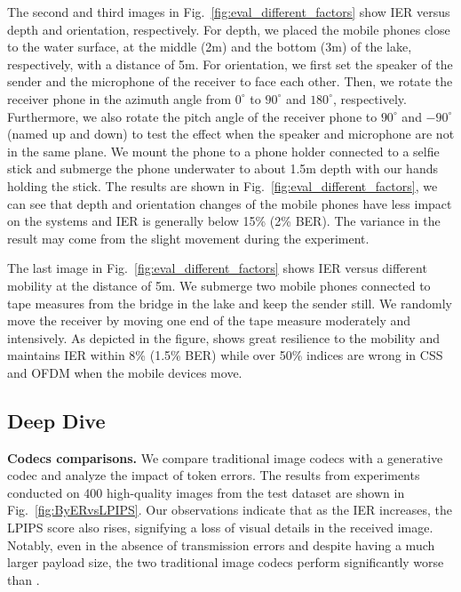 The second and third images in Fig.~\ref{fig:eval_different_factors} show IER versus depth and orientation, respectively. For depth, we placed the mobile phones close to the water surface, at the middle (2m) and the bottom (3m) of the lake, respectively, with a distance of 5m.
For orientation, we first set the speaker of the sender and the microphone of the receiver to face each other. Then, we rotate the receiver phone in the azimuth angle from $0^{\circ}$ to $90^{\circ}$ and $180^{\circ}$, respectively. Furthermore, we also rotate the pitch angle of the receiver phone to $90^{\circ}$ and $-90^{\circ}$ (named up and down) to test the effect when the speaker and microphone are not in the same plane. We mount the phone to a phone holder connected to a selfie stick and submerge the phone underwater to about 1.5m depth with our hands holding the stick.
The results are shown in Fig.~\ref{fig:eval_different_factors}, we can see that depth and orientation changes of the mobile phones have less impact on the systems and IER is generally below 15\% (2\% BER). The variance in the result may come from the slight movement during the experiment.

The last image in Fig.~\ref{fig:eval_different_factors} shows IER versus different mobility at the distance of 5m. We submerge two mobile phones connected to tape measures from the bridge in the lake and keep the sender still. We randomly move the receiver by moving one end of the tape measure moderately and intensively.
As depicted in the figure, \sysname shows great resilience to the mobility and maintains IER within 8\% (1.5\% BER) while over 50\% indices are wrong in CSS and OFDM when the mobile devices move.





\subsection{Deep Dive}

\noindent\textbf{Codecs comparisons.}
We compare traditional image codecs with a generative codec and analyze the impact of token errors. The results from experiments conducted on 400 high-quality images from the test dataset are shown in Fig.~\ref{fig:ByERvsLPIPS}. Our observations indicate that as the IER increases, the LPIPS score also rises, signifying a loss of visual details in the received image. Notably, even in the absence of transmission errors and despite having a much larger payload size, the two traditional image codecs perform significantly worse than \sysname.






